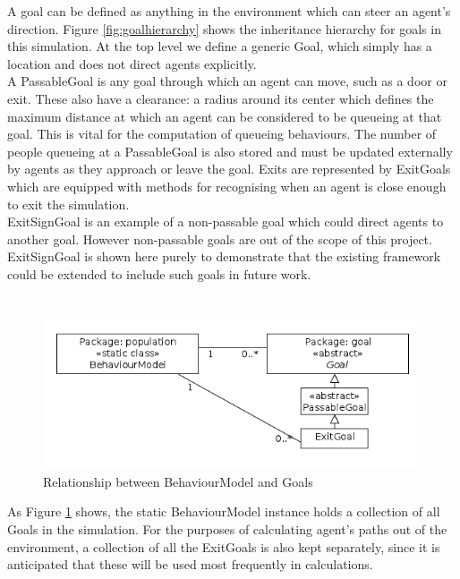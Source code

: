 A goal can be defined as anything in the environment which can steer an agent's direction. Figure \ref{fig:goalhierarchy} shows the inheritance hierarchy for goals in this simulation. At the top level we define a generic Goal, which simply has a location and does not direct agents explicitly.
\\
A PassableGoal is any goal through which an agent can move, such as a door or exit. These also have a clearance: a radius around its center which defines the maximum distance at which an agent can be considered to be queueing at that goal. This is vital for the computation of queueing behaviours. The number of people queueing at a PassableGoal is also stored and must be updated externally by agents as they approach or leave the goal.
Exits are represented by ExitGoals which are equipped with methods for recognising when an agent is close enough to exit the simulation.
\\
ExitSignGoal is an example of a non-passable goal which could direct agents to another goal. However non-passable goals are out of the scope of this project. ExitSignGoal is shown here purely to demonstrate that the existing framework could be extended to include such goals in future work.
\\
\\
\begin{figure}[here]
\centering
\includegraphics[scale=0.7]{../UMLDiagrams/BehaviourModelToGoalModel.png}
\caption{Relationship between BehaviourModel and Goals}
\label{fig:behaviourtogoalmodel}
\end{figure}

As Figure \ref{fig:behaviourtogoalmodel} shows, the static BehaviourModel instance holds a collection of all Goals in the simulation. For the purposes of calculating agent's paths out of the environment, a collection of all the ExitGoals is also kept separately, since it is anticipated that these will be used most frequently in calculations.\\

%

